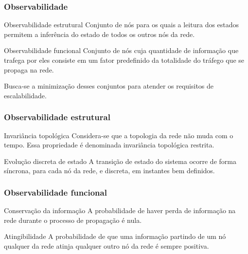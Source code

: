 \documentclass[10pt]{beamer}
\begin{document}
\begin{frame}
    \frametitle{Observabilidade}

\begin{block}{Observabilidade estrutural}
Conjunto de nós para os quais a leitura dos estados permitem a inferência do
estado de todos os outros nós da rede.
\end{block}

\vfill

\begin{block}{Observabilidade funcional}
Conjunto de nós cuja quantidade de informação que trafega por eles consiste
em um fator predefinido da totalidade do tráfego que se propaga na rede.
\end{block}

\vfill

Busca-se a minimização desses conjuntos para atender os requisitos de
escalabilidade.
\end{frame}

\begin{frame}
    \frametitle{Observabilidade estrutural}

\begin{block}{Invariância topológica}
Considera-se que a topologia da rede não muda com o tempo.
Essa propriedade é denominada invariância topológica restrita.
\end{block}

\vfill

\begin{block}{Evolução discreta de estado}
A transição de estado do sistema ocorre de forma síncrona, para cada nó da
rede, e discreta, em instantes bem definidos.
\end{block}

\end{frame}

\begin{frame}
    \frametitle{Observabilidade funcional}

\begin{block}{Conservação da informação}
A probabilidade de haver perda de informação na rede durante o processo de
propagação é nula.
\end{block}

\vfill

\begin{block}{Atingibilidade}
A probabilidade de que uma informação partindo de um nó qualquer da rede
atinja qualquer outro nó da rede é sempre positiva.
\end{block}

\end{frame}
\end{document}
